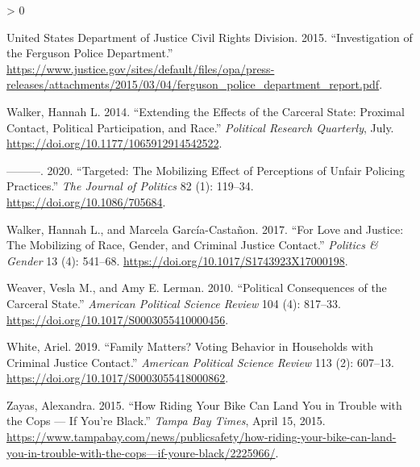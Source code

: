 \documentclass[
  12pt,
]{article}
\newlength{\cslhangindent}
\newenvironment{CSLReferences}[2] %
 {%
  \setlength{\parindent}{0pt}
  \ifodd #1 \everypar{\setlength{\hangindent}{\cslhangindent}}\ignorespaces\fi
  \ifnum #2 > 0
  \setlength{\parskip}{#2\baselineskip}
  \fi
 }%
 {}
\begin{document}
\begin{CSLReferences}{1}{0}
\leavevmode\hypertarget{ref-UnitedStatesDepartmentofJusticeCivilRightsDivision2015}{}%
United States Department of Justice Civil Rights Division. 2015. {``Investigation of the {Ferguson Police Department}.''} \url{https://www.justice.gov/sites/default/files/opa/press-releases/attachments/2015/03/04/ferguson_police_department_report.pdf}.

\leavevmode\hypertarget{ref-Walker2014}{}%
Walker, Hannah L. 2014. {``Extending the {Effects} of the {Carceral State}: {Proximal Contact}, {Political Participation}, and {Race}.''} \emph{Political Research Quarterly}, July. \url{https://doi.org/10.1177/1065912914542522}.

\leavevmode\hypertarget{ref-Walker2020}{}%
---------. 2020. {``Targeted: {The Mobilizing Effect} of {Perceptions} of {Unfair Policing Practices}.''} \emph{The Journal of Politics} 82 (1): 119--34. \url{https://doi.org/10.1086/705684}.

\leavevmode\hypertarget{ref-Walker2017}{}%
Walker, Hannah L., and Marcela García-Castañon. 2017. {``For {Love} and {Justice}: {The Mobilizing} of {Race}, {Gender}, and {Criminal Justice Contact}.''} \emph{Politics \& Gender} 13 (4): 541--68. \url{https://doi.org/10.1017/S1743923X17000198}.

\leavevmode\hypertarget{ref-Weaver2010}{}%
Weaver, Vesla M., and Amy E. Lerman. 2010. {``Political {Consequences} of the {Carceral State}.''} \emph{American Political Science Review} 104 (4): 817--33. \url{https://doi.org/10.1017/S0003055410000456}.

\leavevmode\hypertarget{ref-White2019}{}%
White, Ariel. 2019. {``Family {Matters}? {Voting Behavior} in {Households} with {Criminal Justice Contact}.''} \emph{American Political Science Review} 113 (2): 607--13. \url{https://doi.org/10.1017/S0003055418000862}.

\leavevmode\hypertarget{ref-Zayas2015}{}%
Zayas, Alexandra. 2015. {``How Riding Your Bike Can Land You in Trouble with the Cops --- If You're Black.''} \emph{Tampa Bay Times}, April 15, 2015. \url{https://www.tampabay.com/news/publicsafety/how-riding-your-bike-can-land-you-in-trouble-with-the-cops—if-youre-black/2225966/}.

\end{CSLReferences}
\end{document}

